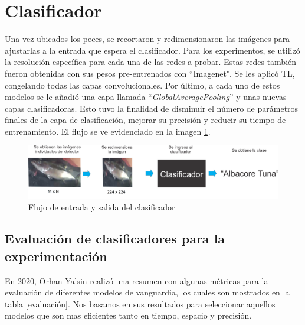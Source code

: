 \section{Clasificador}
Una vez ubicados los peces, se recortaron y redimensionaron las imágenes para 
ajustarlas a la entrada que espera el clasificador. Para los experimentos, se 
utilizó la resolución específica para cada una de las redes a probar. Estas 
redes también fueron obtenidas con sus pesos pre-entrenados con 
``Imagenet". Se les aplicó TL, congelando todas las capas convolucionales. Por 
último, a cada uno de estos modelos se le añadió una capa llamada 
``\textit{GlobalAveragePooling}'' y unas nuevas capas clasificadoras. Esto tuvo 
la finalidad de disminuir el número de parámetros 
finales de la capa de clasificación, mejorar su precisión y reducir su tiempo 
de entrenamiento. El flujo se ve evidenciado en la imagen \ref{fig:clasificador_pez}.

\begin{figure}[h!]
\includegraphics[width=1\textwidth]{images/clasificador_label.png}
\caption{Flujo de entrada y salida del clasificador }
\label{fig:clasificador_pez}
\end{figure}


\subsection{Evaluación de clasificadores para la experimentación}
En 2020, Orhan Yalsin \cite{DataModelos} realizó una resumen con algunas métricas para la 
evaluación de diferentes modelos de vanguardia, los cuales son mostrados 
en la tabla \ref{evaluación}. Nos basamos en sus resultados para seleccionar 
aquellos modelos que son mas eficientes tanto en tiempo, espacio y precisión.

